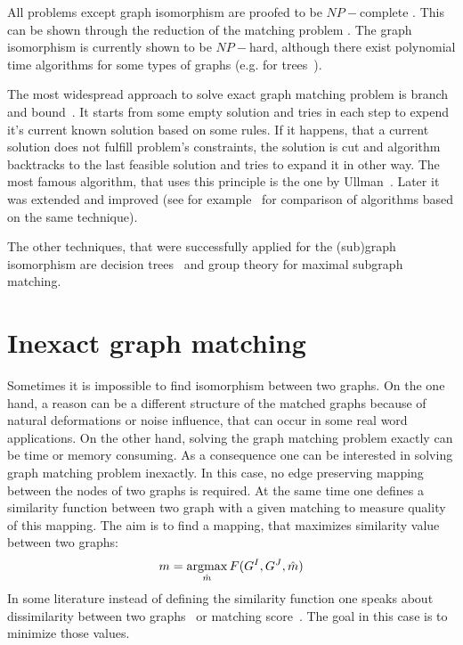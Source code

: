 All problems except graph isomorphism are proofed to be $NP-$complete . This can be shown through the reduction of the matching problem . The graph isomorphism is currently shown to be $NP-$hard, although there exist polynomial time algorithms for some types of graphs (e.g. for %
trees~\cite{Aho_Ullman}).

The most widespread approach to solve exact graph matching problem is branch and bound~. It starts from some empty solution and tries in each step to expend it's current known solution based on some rules. If it happens, that a current solution does not fulfill problem's constraints, the solution is cut and algorithm backtracks to the last feasible solution and tries to expand it in other way. The most famous algorithm, that uses this principle is the one by Ullman~\cite{Ullmann}. Later it was extended and improved (see for example~\cite{Lee2013} for comparison of algorithms based on the same technique).

The other techniques, that were successfully applied for the (sub)graph isomorphism are decision trees~\cite{Messmer1999,Shearer1998,Shearer2001} and group theory\cite{McKay} for maximal subgraph matching. 

\section{Inexact graph matching}

Sometimes it is impossible to find isomorphism between two graphs. On the one hand, a reason can be a different structure of the matched graphs because of natural deformations or noise influence, that can occur in some real word applications. On the other hand, solving the graph matching problem exactly can be time or memory consuming. As a consequence one can be interested in solving graph matching problem inexactly. In this case, no edge preserving mapping between the nodes of two graphs is required. At the same time one defines a similarity function between two graph with a given matching to measure quality of this mapping. The aim is to find a mapping, that maximizes similarity value between two graphs:
\begin{equation} \label{gGMP}
m = \mathop{\rm argmax}_{\hat{m}}F(G^I, G^J, \hat{m})
\end{equation}
In some literature instead of defining the similarity function one speaks about dissimilarity between two graphs~ or matching score~. The goal in this case is to minimize those values.


